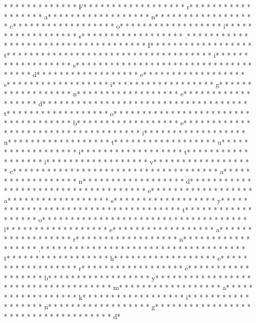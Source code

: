 *  * * *  *  * * *  *  * * *  * F* * *  * * *  * * *  *  * * *  *  * * *  * r* * *  * * *  * * *  *  * * *  *  * * *  * a* * *  * * *  * * *  *  * * *  *  * * *  * n* * *  * * *  * * *  *  * * *  *  * * *  * c* * *  * * *  * * *  *  * * *  *  * * *  * o* * *  * * *  * * *  *  * * *  *  * * *  * i* * *  * * *  * * *  *  * * *  *  * * *  * s* * *  * * *  * * *  *  * * *  *  * * *  * .* * *  * * *  * * *  *  * * *  *  * * *  *  * * *  * * *  * * *  *  * * *  *  * * *  * I* * *  * * *  * * *  *  * * *  *  * * *  * t* * *  * * *  * * *  *  * * *  *  * * *  *  * * *  * * *  * * *  *  * * *  *  * * *  * i* * *  * * *  * * *  *  * * *  *  * * *  * s* * *  * * *  * * *  *  * * *  *  * * *  *  * * *  * * *  * * *  *  * * *  *  * * *  * d* * *  * * *  * * *  *  * * *  *  * * *  * e* * *  * * *  * * *  *  * * *  *  * * *  * s* * *  * * *  * * *  *  * * *  *  * * *  * i* * *  * * *  * * *  *  * * *  *  * * *  * g* * *  * * *  * * *  *  * * *  *  * * *  * n* * *  * * *  * * *  *  * * *  *  * * *  * e* * *  * * *  * * *  *  * * *  *  * * *  * d* * *  * * *  * * *  *  * * *  *  * * *  *  * * *  * * *  * * *  *  * * *  *  * * *  * t* * *  * * *  * * *  *  * * *  *  * * *  * o* * *  * * *  * * *  *  * * *  *  * * *  *  * * *  * * *  * * *  *  * * *  *  * * *  * b* * *  * * *  * * *  *  * * *  *  * * *  * e* * *  * * *  * * *  *  * * *  *  * * *  *  * * *  * * *  * * *  *  * * *  *  * * *  * i* * *  * * *  * * *  *  * * *  *  * * *  * n* * *  * * *  * * *  *  * * *  *  * * *  * t* * *  * * *  * * *  *  * * *  *  * * *  * u* * *  * * *  * * *  *  * * *  *  * * *  * i* * *  * * *  * * *  *  * * *  *  * * *  * t* * *  * * *  * * *  *  * * *  *  * * *  * i* * *  * * *  * * *  *  * * *  *  * * *  * v* * *  * * *  * * *  *  * * *  *  * * *  * e* * *  * * *  * * *  *  * * *  *  * * *  *  * * *  * * *  * * *  *  * * *  *  * * *  * a* * *  * * *  * * *  *  * * *  *  * * *  * n* * *  * * *  * * *  *  * * *  *  * * *  * d* * *  * * *  * * *  *  * * *  *  * * *  *  * * *  * * *  * * *  *  * * *  *  * * *  * e* * *  * * *  * * *  *  * * *  *  * * *  * a* * *  * * *  * * *  *  * * *  *  * * *  * s* * *  * * *  * * *  *  * * *  *  * * *  * y* * *  * * *  * * *  *  * * *  *  * * *  *  * * *  * * *  * * *  *  * * *  *  * * *  * t* * *  * * *  * * *  *  * * *  *  * * *  * o* * *  * * *  * * *  *  * * *  *  * * *  *  * * *  * * *  * * *  *  * * *  *  * * *  * l* * *  * * *  * * *  *  * * *  *  * * *  * e* * *  * * *  * * *  *  * * *  *  * * *  * a* * *  * * *  * * *  *  * * *  *  * * *  * r* * *  * * *  * * *  *  * * *  *  * * *  * n* * *  * * *  * * *  *  * * *  *  * * *  * ,* * *  * * *  * * *  *  * * *  *  * * *  *  * * *  * * *  * * *  *  * * *  *  * * *  * t* * *  * * *  * * *  *  * * *  *  * * *  * h* * *  * * *  * * *  *  * * *  *  * * *  * e* * *  * * *  * * *  *  * * *  *  * * *  * r* * *  * * *  * * *  *  * * *  *  * * *  * e* * *  * * *  * * *  *  * * *  *  * * *  * b* * *  * * *  * * *  *  * * *  *  * * *  * y* * *  * * *  * * *  *  * * *  *  * * *  *  * * *  * * *  * * *  *  * * *  *  * * *  * m* * *  * * *  * * *  *  * * *  *  * * *  * a* * *  * * *  * * *  *  * * *  *  * * *  * k* * *  * * *  * * *  *  * * *  *  * * *  * i* * *  * * *  * * *  *  * * *  *  * * *  * n* * *  * * *  * * *  *  * * *  *  * * *  * g* * *  * * *  * * *  *  * * *  *  * * *  *  * * *  * * *  * * *  *  * * *  *  * * *  * d* 
